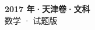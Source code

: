 \documentclass[zihao=-4, a4paper]{ctexart}
\begin{document}
\begin{center}
  {\Large\bfseries 2017 年·天津卷·文科}\\[4pt]
  {\large 数学 · 试题版}
\end{center}
\medskip
{}

\end{document}
